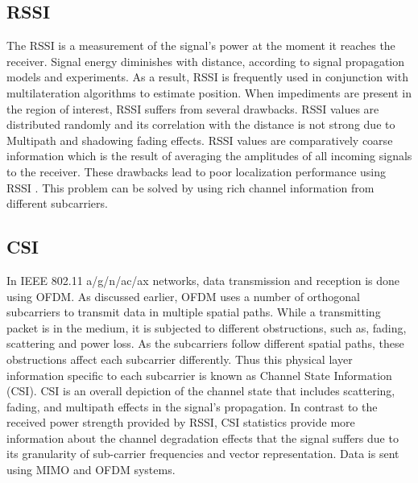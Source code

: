 \subsection{RSSI}
The RSSI is a measurement of the signal's power at the moment it reaches the receiver. Signal energy diminishes with distance, according to signal propagation models and experiments. As a result, RSSI is frequently used in conjunction with multilateration algorithms to estimate position. When impediments are present in the region of interest, RSSI suffers from several drawbacks. RSSI values are distributed randomly and its correlation with the distance is not strong due to Multipath and shadowing fading effects. RSSI values are comparatively coarse information which is the result of averaging the amplitudes of all incoming signals to the receiver. These drawbacks lead to poor localization performance using RSSI \cite{Wang2016}. This problem can be solved by using rich channel information from different subcarriers.

\subsection{CSI}
In IEEE 802.11 a/g/n/ac/ax networks, data transmission and reception is done using OFDM. As discussed earlier, OFDM uses a number of orthogonal subcarriers to transmit data in multiple spatial paths. While a transmitting packet is in the medium, it is subjected to different obstructions, such as, fading, scattering and power loss. As the subcarriers follow different spatial paths, these obstructions affect each subcarrier differently. Thus this physical layer information specific to each subcarrier is known as Channel State Information (CSI). CSI is an overall depiction of the channel state that includes scattering, fading, and multipath effects in the signal's propagation. In contrast to the received power strength provided by RSSI, CSI statistics provide more information about the channel degradation effects that the signal suffers due to its granularity of sub-carrier frequencies and vector representation. Data is sent using MIMO and OFDM systems.

